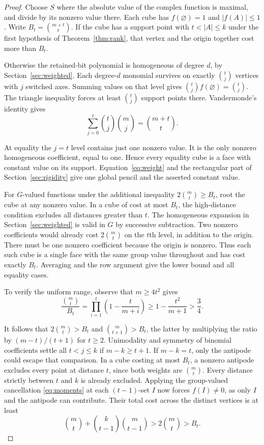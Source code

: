 \documentclass[11pt,letterpaper]{article}
\numberwithin{equation}{section}
\begin{document}
\begin{proof}

Choose $S$ where the absolute value of the complex function is maximal, and divide by its
nonzero value there. Each cube has $f(\varnothing)=1$ and $|f(A)|\le1$. Write
$B_t=\binom{m+t}{t}$. If the cube has a support point with $t<|A|\le k$ under the first
hypothesis of Theorem~\ref{thm:rank}, that vertex and the origin together cost more than
$B_t$.

Otherwise the retained-bit polynomial is homogeneous of degree $d$, by
Section~\ref{sec:weighted}. Each degree-$d$ monomial survives on exactly $\binom tj$ vertices
with $j$ switched axes. Summing values on that level gives $\binom tj f(\varnothing)=\binom
tj$. The triangle inequality forces at least $\binom tj$ support points there. Vandermonde's
identity gives
\[
\sum_{j=0}^t\binom tj\binom mj=\binom{m+t}{t}.
\]

At equality the $j=t$ level contains just one nonzero value. It is the only nonzero
homogeneous coefficient, equal to one. Hence every equality cube is a face with constant value
on its support. Equation~\eqref{eq:weight} and the rectangular part of
Section~\ref{sec:rigidity} give one global pencil and the asserted constant value.

For $G$-valued functions under the additional inequality $2\binom mt\ge B_t$, root the cube at
any nonzero value. In a cube of cost at most $B_t$, the high-distance condition excludes all
distances greater than $t$. The homogeneous expansion in Section~\ref{sec:weighted} is valid
in $G$ by successive subtraction. Two nonzero coefficients would already cost $2\binom mt$ on
the $t$th level, in addition to the origin. There must be one nonzero coefficient because the
origin is nonzero. Thus each such cube is a single face with the same group value throughout
and has cost exactly $B_t$. Averaging and the row argument give the lower bound and all
equality cases.

To verify the uniform range, observe that $m\ge4t^2$ gives
\[
\frac{\binom mt}{B_t}=\prod_{i=1}^{t}\left(1-\frac{t}{m+i}\right)
\ge 1-\frac{t^2}{m+1}>\frac34 .
\]

It follows that $2\binom mt>B_t$ and $\binom m{t+1}>B_t$, the latter by multiplying the ratio
by $(m-t)/(t+1)$ for $t\ge2$. Unimodality and symmetry of binomial coefficients settle all
$t<j\le k$ if $m-k\ge t+1$. If $m-k=t$, only the antipode could escape that comparison. In a
cube costing at most $B_t$, a nonzero antipode excludes every point at distance $t$, since
both weights are $\binom mt$. Every distance strictly between $t$ and $k$ is already excluded.
Applying the group-valued cancellation \eqref{eq:moments} at each $(t-1)$-set $I$ now forces
$f(I)\ne0$, as only $I$ and the antipode can contribute. Their total cost across the distinct
vertices is at least
\[
\binom mt+\binom{k}{t-1}\binom m{t-1}>2\binom mt>B_t .
\]


\end{proof}
\end{document}
